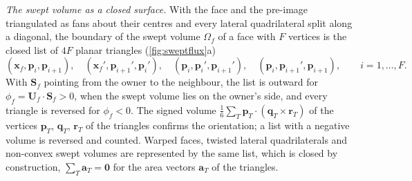 \documentclass[preprint,12pt]{elsarticle}
\newcommand{\x}{\mathbf{x}}
\newcommand{\Sf}{\mathbf{S}_f}
\begin{document}
\emph{The swept volume as a closed surface.} With the face and the pre-image triangulated as fans about their centres and every lateral quadrilateral split along a diagonal, the boundary of the swept volume $\Omega_f$ of a face with $F$ vertices is the closed list of $4F$ planar triangles (\cref{fig:sweptflux}a)
\begin{equation}
(\x_f, \mathbf{p}_i, \mathbf{p}_{i+1}), \quad
(\x_f', \mathbf{p}_{i+1}', \mathbf{p}_i'), \quad
(\mathbf{p}_i, \mathbf{p}_i', \mathbf{p}_{i+1}'), \quad
(\mathbf{p}_i, \mathbf{p}_{i+1}', \mathbf{p}_{i+1}), \qquad i = 1, \ldots, F .
\label{eq:swept-triangles}
\end{equation}
With $\Sf$ pointing from the owner to the neighbour, the list is outward for $\phi_f = \mathbf{U}_f\cdot\Sf > 0$, when the swept volume lies on the owner's side, and every triangle is reversed for $\phi_f < 0$. The signed volume $\tfrac16\sum_T \mathbf{p}_T\cdot(\mathbf{q}_T\times\mathbf{r}_T)$ of the vertices $\mathbf{p}_T$, $\mathbf{q}_T$, $\mathbf{r}_T$ of the triangles confirms the orientation; a list with a negative volume is reversed and counted. Warped faces, twisted lateral quadrilaterals and non-convex swept volumes are represented by the same list, which is closed by construction, $\sum_T \mathbf{a}_T = \mathbf{0}$ for the area vectors $\mathbf{a}_T$ of the triangles.
\end{document}
